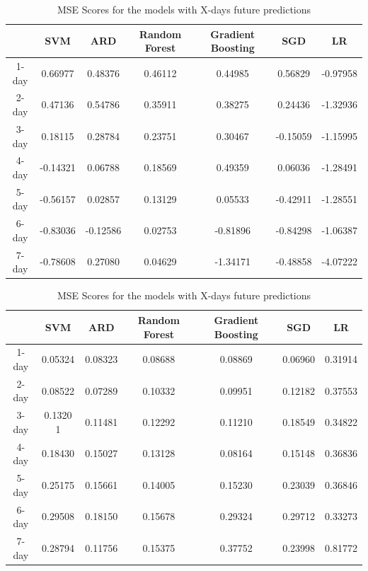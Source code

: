 \documentclass[12pt,a4paper]{article}
\begin{document}
\begin{table}[htb]
    \begin{tabular}{ |c|c|c|c|c|c|c| }
        \hline
         & SVM & ARD & Random Forest & Gradient Boosting & SGD & LR \\
        \hline
        1-day & 0.66977 & 0.48376 & 0.46112 & 0.44985 & 0.56829 & -0.97958 \\
        \hline
        2-day & 0.47136 & 0.54786 & 0.35911 & 0.38275 & 0.24436 & -1.32936 \\
        \hline
        3-day & 0.18115 & 0.28784 & 0.23751 & 0.30467 & -0.15059 & -1.15995 \\
        \hline
        4-day & -0.14321 & 0.06788 & 0.18569 & 0.49359 & 0.06036 & -1.28491 \\
        \hline
        5-day & -0.56157 & 0.02857 & 0.13129 & 0.05533 & -0.42911 & -1.28551 \\
        \hline
        6-day & -0.83036 & -0.12586 & 0.02753 & -0.81896 & -0.84298 & -1.06387 \\
        \hline
        7-day & -0.78608 & 0.27080 & 0.04629 & -1.34171 & -0.48858 & -4.07222 \\
        \hline 
        \end{tabular}
        \caption{ $R^2$ Scores for the models with X-days future predictions}
    \begin{tabular}{ |c|c|c|c|c|c|c| }
        \hline
         & SVM & ARD & Random Forest & Gradient Boosting & SGD & LR \\
        \hline
        1-day & 0.05324 & 0.08323 & 0.08688 & 0.08869 & 0.06960 & 0.31914 \\
        \hline
        2-day & 0.08522 & 0.07289 & 0.10332 & 0.09951 & 0.12182 & 0.37553 \\
        \hline
        3-day & 0.1320  1 & 0.11481 & 0.12292 & 0.11210 & 0.18549 & 0.34822  \\
        \hline
        4-day & 0.18430 & 0.15027 & 0.13128 & 0.08164 & 0.15148 & 0.36836 \\
        \hline
        5-day & 0.25175 & 0.15661 & 0.14005 & 0.15230 & 0.23039 & 0.36846 \\
        \hline
        6-day & 0.29508 & 0.18150 & 0.15678 & 0.29324 & 0.29712 & 0.33273 \\
        \hline
        7-day & 0.28794 & 0.11756 & 0.15375 & 0.37752 & 0.23998 & 0.81772 \\
        \hline 
        \end{tabular}
        \caption{MSE Scores for the models with X-days future predictions}

\end{table}
\end{document}
